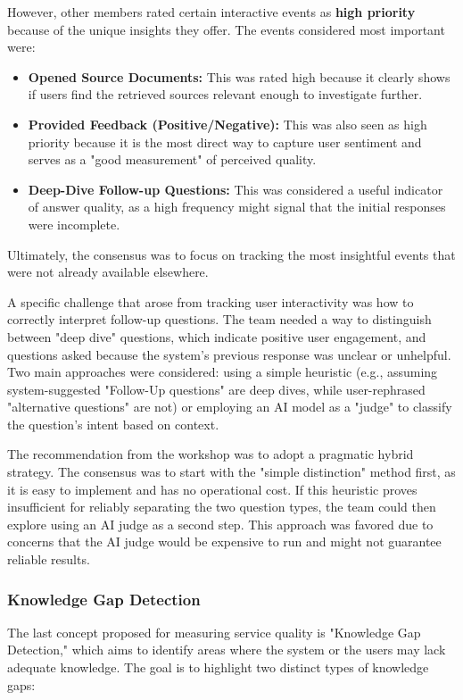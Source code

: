 \documentclass[
	english,
	ruledheaders=section,%
	class=report,%
	thesis={type=bachelor},%
	accentcolor=1b,%
	custommargins=true,%
	marginpar=false,%
	parskip=half-,%
	fontsize=11pt,%
	DIV=14,
]{tudapub}
\begin{document}
However, other members rated certain interactive events as \textbf{high priority} because of the unique insights they offer. The events considered most important were:
\begin{itemize}
    \item \textbf{Opened Source Documents:} This was rated high because it clearly shows if users find the retrieved sources relevant enough to investigate further.
    \item \textbf{Provided Feedback (Positive/Negative):} This was also seen as high priority because it is the most direct way to capture user sentiment and serves as a "good measurement" of perceived quality.
    \item \textbf{Deep-Dive Follow-up Questions:} This was considered a useful indicator of answer quality, as a high frequency might signal that the initial responses were incomplete.
\end{itemize}
Ultimately, the consensus was to focus on tracking the most insightful events that were not already available elsewhere.

A specific challenge that arose from tracking user interactivity was how to correctly interpret follow-up questions. The team needed a way to distinguish between "deep dive" questions, which indicate positive user engagement, and questions asked because the system's previous response was unclear or unhelpful. Two main approaches were considered: using a simple heuristic (e.g., assuming system-suggested "Follow-Up questions" are deep dives, while user-rephrased "alternative questions" are not) or employing an AI model as a "judge" to classify the question's intent based on context.

The recommendation from the workshop was to adopt a pragmatic hybrid strategy. The consensus was to start with the "simple distinction" method first, as it is easy to implement and has no operational cost. If this heuristic proves insufficient for reliably separating the two question types, the team could then explore using an AI judge as a second step. This approach was favored due to concerns that the AI judge would be expensive to run and might not guarantee reliable results.
\subsubsection{Knowledge Gap Detection}
The last concept proposed for measuring service quality is "Knowledge Gap Detection," which aims to identify areas where the system or the users may lack adequate knowledge. The goal is to highlight two distinct types of knowledge gaps:
\end{document}
